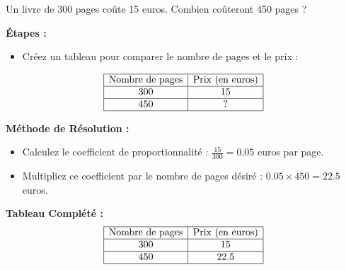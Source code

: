 \documentclass{article}
\begin{document}
\begin{tcolorbox}[colback=purple!10!white, colframe=orange!75!black, title=\textcolor{white}{Exemple 2}, 
                  sharp corners=south]
    Un livre de 300 pages coûte 15 euros. Combien coûteront 450 pages ?

    \textbf{Étapes :}
    \begin{itemize}
        \item Créez un tableau pour comparer le nombre de pages et le prix :
    \end{itemize}

    \[
    \begin{array}{|c|c|}
    \hline
    \text{Nombre de pages} & \text{Prix (en euros)} \\
    \hline
    300 & 15 \\
    \hline
    450 & ? \\
    \hline
    \end{array}
    \]

    \textbf{Méthode de Résolution :}
    \begin{itemize}
        \item Calculez le coefficient de proportionnalité : \(\frac{15}{300} = 0.05\) euros par page.
        \item Multipliez ce coefficient par le nombre de pages désiré : \(0.05 \times 450 = 22.5\) euros.
    \end{itemize}

    \textbf{Tableau Complété :}
    \[
    \begin{array}{|c|c|}
    \hline
    \text{Nombre de pages} & \text{Prix (en euros)} \\
    \hline
    300 & 15 \\
    \hline
    450 & 22.5 \\
    \hline
    \end{array}
    \]
\end{tcolorbox}

\vspace{0.2cm}
\end{document}
